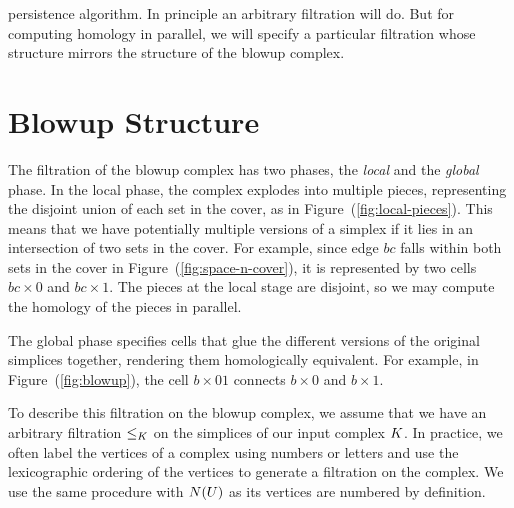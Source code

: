 \documentclass{elsarticle}
\begin{document}
persistence algorithm. In principle an arbitrary filtration will do.
But for computing homology in parallel, we will specify a particular filtration 
whose structure mirrors the structure of the blowup complex. 
%
%
\section{Blowup Structure}
\label{sec:blowup_structure}
The filtration of the blowup complex has two phases,  the \emph{local} and the
 \emph{global} phase. In the local phase, the complex explodes into multiple 
pieces, representing the disjoint union of each set in the cover, as in Figure~(\ref{fig:local-pieces}). 
This means that we have potentially multiple versions of a simplex 
if it lies in an intersection of two sets in the cover. For example, since edge $bc$ falls within both sets in the 
cover in Figure~(\ref{fig:space-n-cover}), it is represented by two cells 
$bc \times 0$ and $bc \times 1$. The pieces at the local stage are disjoint, so 
we may compute the homology of the pieces in parallel. 

The global phase specifies cells that glue the different versions of the 
original simplices together, rendering them homologically equivalent.  
For example, in Figure~(\ref{fig:blowup}), the cell 
$b \times 01$ connects $b \times 0$ and $b \times 1$.  

To describe this filtration on the blowup complex, we assume that we have an 
arbitrary filtration $\leq_{K}$ on the simplices of our input complex $K$.  In practice, 
we often label the vertices of a complex using numbers or letters and use the lexicographic 
ordering of the vertices to generate a filtration on the complex. We use the same procedure 
with $N(U)$ as its vertices are numbered by definition.
\end{document}
